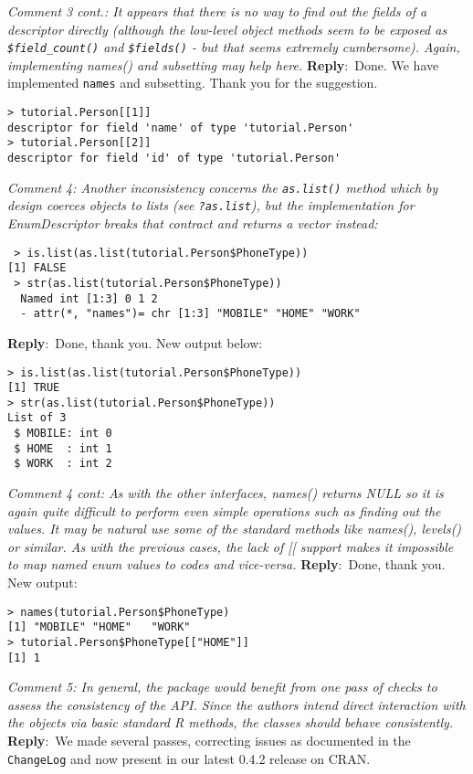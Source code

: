 \documentclass[10pt]{article}
\newcommand{\pointRaised}[2]{\smallskip %
  \textsl{{\fontseries{b}\selectfont #1}: #2}\newline}
\newcommand{\reply}[1]{\textbf{Reply}:\ #1 \smallskip } %
\begin{document}
\pointRaised{Comment 3 cont.}{It appears that there is no way to find out the fields of a descriptor 
  directly (although the low-level object methods seem to be exposed as 
  \texttt{\$field\_count()} and \texttt{\$fields()} - but that seems extremely cumbersome). 
  Again, implementing names() and subsetting may help here.}
\reply{Done. We have implemented \texttt{names} and subsetting.  Thank you for the
  suggestion.}
\begin{verbatim}
> tutorial.Person[[1]]
descriptor for field 'name' of type 'tutorial.Person' 
> tutorial.Person[[2]]
descriptor for field 'id' of type 'tutorial.Person' 
\end{verbatim}

\pointRaised{Comment 4}{Another inconsistency concerns the \texttt{as.list()} method which by design 
  coerces objects to lists (see \texttt{?as.list}), but the implementation for 
  EnumDescriptor breaks that contract and returns a vector instead:}

\begin{verbatim}
 > is.list(as.list(tutorial.Person$PhoneType))
[1] FALSE
 > str(as.list(tutorial.Person$PhoneType))
  Named int [1:3] 0 1 2
  - attr(*, "names")= chr [1:3] "MOBILE" "HOME" "WORK"
\end{verbatim}

\reply{Done, thank you. New output below:}
\begin{verbatim}
> is.list(as.list(tutorial.Person$PhoneType))
[1] TRUE
> str(as.list(tutorial.Person$PhoneType))
List of 3
 $ MOBILE: int 0
 $ HOME  : int 1
 $ WORK  : int 2
\end{verbatim}

\pointRaised{Comment 4 cont}{As with the other interfaces, names() returns NULL so it is again quite
  difficult to perform even simple operations such as finding out the 
  values. It may be natural use some of the standard methods like names(), 
  levels() or similar. As with the previous cases, the lack of [[ support
  makes it impossible to map named enum values to codes and vice-versa.}
\reply{Done, thank you.  New output:}
\begin{verbatim}
> names(tutorial.Person$PhoneType)
[1] "MOBILE" "HOME"   "WORK"  
> tutorial.Person$PhoneType[["HOME"]]
[1] 1
\end{verbatim}

\pointRaised{Comment 5}{In general, the package would benefit from one pass of checks to assess
  the consistency of the API. Since the authors intend direct interaction
  with the objects via basic standard R methods, the classes should behave 
  consistently.}
\reply{We made several passes, correcting issues as documented in the
  \texttt{ChangeLog} and now present in our latest 0.4.2 release on CRAN.}
\end{document}

